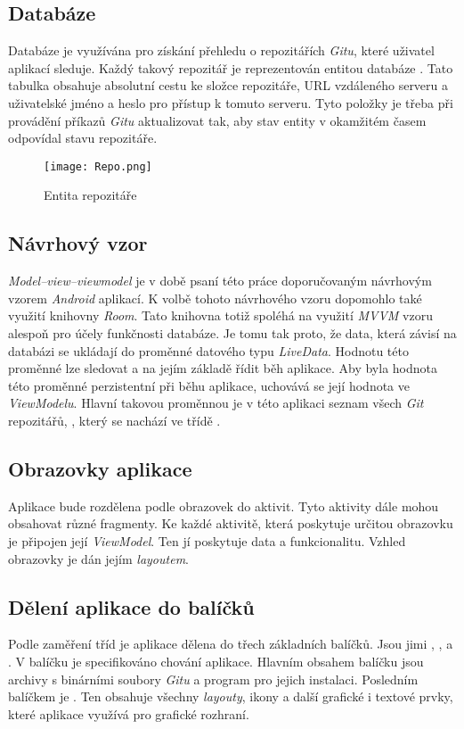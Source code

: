     \newpage
    \subsection{Databáze}
    Databáze je využívána pro získání přehledu o repozitářích \emph{Gitu}, které uživatel aplikací sleduje. Každý takový repozitář je reprezentován entitou databáze . Tato tabulka obsahuje absolutní cestu ke složce repozitáře, URL vzdáleného serveru a uživatelské jméno a heslo pro přístup k tomuto serveru. Tyto položky je třeba při provádění příkazů \emph{Gitu} aktualizovat tak, aby stav entity v okamžitém časem odpovídal stavu repozitáře.

    \begin{figure}[h!]
        \centering
        \vspace{0.5cm}
        \texttt{[image: Repo.png]}
        \caption{Entita repozitáře}
        \label{RepoTable}
    \end{figure}

    \subsection{Návrhový vzor}
    \emph{Model–view–viewmodel} je v době psaní této práce doporučovaným návrhovým vzorem \emph{Android} aplikací. K volbě tohoto návrhového vzoru dopomohlo také využití knihovny \emph{Room}. Tato knihovna totiž spoléhá na využití \emph{MVVM} vzoru alespoň pro účely funkčnosti databáze. Je tomu tak proto, že data, která závisí na databázi se ukládají do proměnné datového typu \emph{LiveData}. Hodnotu této proměnné lze sledovat a na jejím základě řídit běh aplikace. Aby byla hodnota této proměnné perzistentní při běhu aplikace, uchovává se její hodnota ve \emph{ViewModelu}. Hlavní takovou proměnnou je v této aplikaci seznam všech \emph{Git} repozitářů, , který se nachází ve třídě .
    
    \subsection{Obrazovky aplikace}
    Aplikace bude rozdělena podle obrazovek do aktivit. Tyto aktivity dále mohou obsahovat různé fragmenty. Ke každé aktivitě, která poskytuje určitou obrazovku je připojen její \emph{ViewModel}. Ten jí poskytuje data a funkcionalitu. Vzhled obrazovky je dán jejím \emph{layoutem}.

    \newpage
    \subsection{Dělení aplikace do balíčků}
    Podle zaměření tříd je aplikace dělena do třech základních balíčků. Jsou jimi , , a . V balíčku  je specifikováno chování aplikace. Hlavním obsahem balíčku  jsou archivy s binárními soubory \emph{Gitu} a program  pro jejich instalaci. Posledním balíčkem je . Ten obsahuje všechny \emph{layouty}, ikony a další grafické i textové prvky, které aplikace využívá pro grafické rozhraní.

